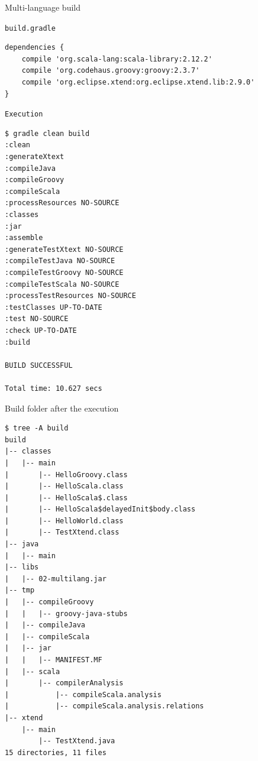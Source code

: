 \documentclass[presentation]{beamer}
\begin{document}
\begin{frame}{Multi-language build}
\begin{block}{\texttt{build.gradle}}
\begin{verbatim}
dependencies {
    compile 'org.scala-lang:scala-library:2.12.2'
    compile 'org.codehaus.groovy:groovy:2.3.7'
    compile 'org.eclipse.xtend:org.eclipse.xtend.lib:2.9.0'
}
		\end{verbatim}
	\end{block}
	\begin{block}{\texttt{Execution}}
		\begin{verbatim}
$ gradle clean build
:clean
:generateXtext
:compileJava
:compileGroovy
:compileScala
:processResources NO-SOURCE
:classes
:jar
:assemble
:generateTestXtext NO-SOURCE
:compileTestJava NO-SOURCE
:compileTestGroovy NO-SOURCE
:compileTestScala NO-SOURCE
:processTestResources NO-SOURCE
:testClasses UP-TO-DATE
:test NO-SOURCE
:check UP-TO-DATE
:build

BUILD SUCCESSFUL

Total time: 10.627 secs
		\end{verbatim}
	\end{block}
	\begin{block}{Build folder after the execution}
		\begin{verbatim}
$ tree -A build
build
|-- classes
|   |-- main
|       |-- HelloGroovy.class
|       |-- HelloScala.class
|       |-- HelloScala$.class
|       |-- HelloScala$delayedInit$body.class
|       |-- HelloWorld.class
|       |-- TestXtend.class
|-- java
|   |-- main
|-- libs
|   |-- 02-multilang.jar
|-- tmp
|   |-- compileGroovy
|   |   |-- groovy-java-stubs
|   |-- compileJava
|   |-- compileScala
|   |-- jar
|   |   |-- MANIFEST.MF
|   |-- scala
|       |-- compilerAnalysis
|           |-- compileScala.analysis
|           |-- compileScala.analysis.relations
|-- xtend
    |-- main
        |-- TestXtend.java
15 directories, 11 files
		\end{verbatim}
	\end{block}
\end{frame}
\end{document}
